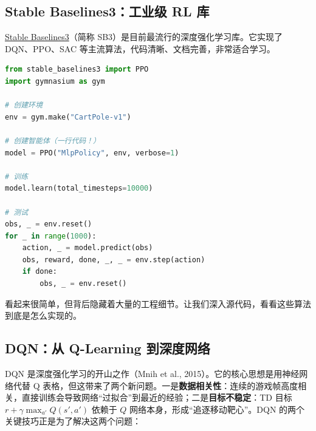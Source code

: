 \subsection{Stable Baselines3：工业级 RL 库}

\href{https://stable-baselines3.readthedocs.io/}{Stable Baselines3}（简称 SB3）是目前最流行的深度强化学习库。它实现了 DQN、PPO、SAC 等主流算法，代码清晰、文档完善，非常适合学习。

\begin{lstlisting}[language=Python, caption={用 SB3 训练一个 PPO 智能体}]
from stable_baselines3 import PPO
import gymnasium as gym

# 创建环境
env = gym.make("CartPole-v1")

# 创建智能体（一行代码！）
model = PPO("MlpPolicy", env, verbose=1)

# 训练
model.learn(total_timesteps=10000)

# 测试
obs, _ = env.reset()
for _ in range(1000):
    action, _ = model.predict(obs)
    obs, reward, done, _, _ = env.step(action)
    if done:
        obs, _ = env.reset()
\end{lstlisting}

看起来很简单，但背后隐藏着大量的工程细节。让我们深入源代码，看看这些算法到底是怎么实现的。

\subsection{DQN：从 Q-Learning 到深度网络}



DQN 是深度强化学习的开山之作（Mnih et al., 2015）。它的核心思想是用神经网络代替 Q 表格，但这带来了两个新问题。一是\textbf{数据相关性}：连续的游戏帧高度相关，直接训练会导致网络“过拟合”到最近的经验；二是\textbf{目标不稳定}：TD 目标 $r + \gamma \max_{a'} Q(s', a')$ 依赖于 $Q$ 网络本身，形成“追逐移动靶心”。DQN 的两个关键技巧正是为了解决这两个问题：

